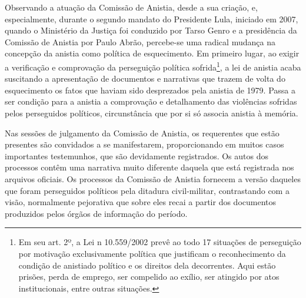 Observando a atuação da Comissão de Anistia, desde a sua criação, e,
especialmente, durante o segundo mandato do Presidente Lula, iniciado em
2007, quando o Ministério da Justiça foi conduzido por Tarso Genro e a
presidência da Comissão de Anistia por Paulo Abrão, percebe-se uma
radical mudança na concepção da anistia como política de esquecimento.
Em primeiro lugar, ao exigir a verificação e comprovação da perseguição
política sofrida\footnote{Em seu art. 2º, a Lei n 10.559/2002 prevê ao
  todo 17 situações de perseguição por motivação exclusivamente política
  que justificam o reconhecimento da condição de anistiado político e os
  direitos dela decorrentes. Aqui estão prisões, perda de emprego, ser
  compelido ao exílio, ser atingido por atos institucionais, entre
  outras situações.}, a lei de anistia acaba suscitando a apresentação
de documentos e narrativas que trazem de volta do esquecimento os fatos
que haviam sido desprezados pela anistia de 1979. Passa a ser condição
para a anistia a comprovação e detalhamento das violências sofridas
pelos perseguidos políticos, circunstância que por si só associa anistia
à memória.

Nas sessões de julgamento da Comissão de Anistia, os requerentes que
estão presentes são convidados a se manifestarem, proporcionando em
muitos casos importantes testemunhos, que são devidamente registrados.
Os autos dos processos contêm uma narrativa muito diferente daquela que
está registrada nos arquivos oficiais. Os processos da Comissão de
Anistia fornecem a versão daqueles que foram perseguidos políticos pela
ditadura civil-militar, contrastando com a visão, normalmente pejorativa
que sobre eles recai a partir dos documentos produzidos pelos órgãos de
informação do período.

